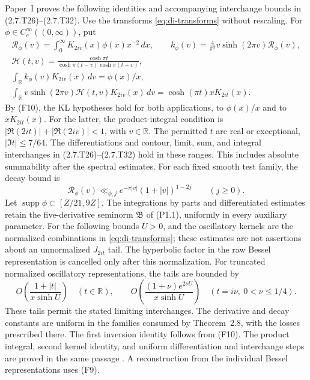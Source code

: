 \begin{fact}\label{fact:transform-interchanges}
Paper~I proves the following identities and accompanying
interchange bounds in (2.7.T26)--(2.7.T32).
Use the transforms \eqref{eq:di-transforms} without rescaling.
For $\phi\in C_c^\infty((0,\infty))$, put
\begin{equation}\label{eq:spectral-transform-applicability}
 \begin{gathered}
 \mathcal R_\phi(v)=\int_0^\infty K_{2iv}(x)\phi(x)x^{-2}\,dx,\qquad
 k_\phi(v)=\frac4{\pi^2}v\sinh(2\pi v)\mathcal R_\phi(v),\\
 \mathcal H(t,v)=\frac{\cosh\pi t}
   {\cosh\pi(t-v)\cosh\pi(t+v)},\\
 \int_{\mathbb R}k_\phi(v)K_{2iv}(x)\,dv=\phi(x)/x,\\
 \int_{\mathbb R}v\sinh(2\pi v)\mathcal H(t,v)K_{2iv}(x)\,dv
       =\cosh(\pi t)xK_{2it}(x).
 \end{gathered}
\end{equation}
By (F10), the KL hypotheses hold for both applications,
to $\phi(x)/x$ and to $xK_{2it}(x)$.
For the latter, the product-integral condition is
$|\Re(2it)|+|\Re(2iv)|<1$, with $v\in\mathbb R$.
The permitted $t$ are real or exceptional, $|\Im t|\le7/64$.
The differentiations and contour, limit, sum, and integral interchanges
in (2.7.T26)--(2.7.T32) hold in these ranges.
This includes absolute summability after the spectral estimates.
For each fixed smooth test family, the decay bound is
\[
 \mathcal R_\phi(v)\ll_{\phi,j}e^{-\pi|v|}(1+|v|)^{1-2j}
 \qquad(j\ge0).
\]
Let $\operatorname{supp}\phi\subset[Z/21,9Z]$.
The integrations by parts and differentiated estimates retain the
five-derivative seminorm $\mathfrak B$ of (P1.1), uniformly in every
auxiliary parameter.
For the following bounds $U>0$, and the oscillatory kernels are the
normalized combinations in \eqref{eq:di-transforms}; these estimates are
not assertions about an unnormalized $J_{2it}$ tail. The hyperbolic factor
in the raw Bessel representation is cancelled only after this normalization.
For truncated normalized oscillatory representations, the tails are bounded by
\[
 O\!\left(\frac{1+|t|}{x\sinh U}\right)\quad(t\in\mathbb R),\qquad
 O\!\left(\frac{(1+\nu)e^{2\nu U}}{x\sinh U}\right)
       \quad(t=i\nu,\ 0<\nu\le1/4).
\]
These tails permit the stated limiting interchanges.
The derivative and decay constants are uniform in the families
consumed by Theorem~2.8, with the losses prescribed there.
The first inversion identity follows from (F10).
The product integral, second kernel identity, and uniform
differentiation and interchange steps are proved in the same passage
\cite[(2.7.T26)--(2.7.T32), pp.~19--20]{PaperI}.
A reconstruction from the individual Bessel representations uses (F9).
\end{fact}

